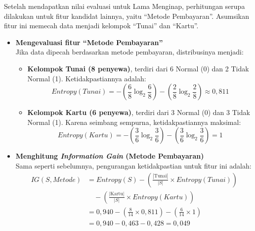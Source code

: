 Setelah mendapatkan nilai evaluasi untuk Lama Menginap, perhitungan serupa dilakukan untuk fitur kandidat lainnya, yaitu ``Metode Pembayaran''. Asumsikan fitur ini memecah data menjadi kelompok ``Tunai'' dan ``Kartu''.

\begin{itemize}
    \item \textbf{Mengevaluasi fitur ``Metode Pembayaran''} \\
    Jika data dipecah berdasarkan metode pembayaran, distribusinya menjadi:
    \begin{itemize}
        \item \textbf{Kelompok Tunai (8 penyewa)}, terdiri dari 6 Normal (0) dan 2 Tidak Normal (1). Ketidakpastiannya adalah:
        $$
        Entropy(Tunai) = - \left(\frac{6}{8} \log_2 \frac{6}{8}\right) - \left(\frac{2}{8} \log_2 \frac{2}{8}\right) \approx 0{,}811
        $$
        
        \item \textbf{Kelompok Kartu (6 penyewa)}, terdiri dari 3 Normal (0) dan 3 Tidak Normal (1). Karena seimbang sempurna, ketidakpastiannya maksimal:
        $$
        Entropy(Kartu) = - \left(\frac{3}{6} \log_2 \frac{3}{6}\right) - \left(\frac{3}{6} \log_2 \frac{3}{6}\right) = 1
        $$
    \end{itemize}
    
    \item \textbf{Menghitung \textit{Information Gain} (Metode Pembayaran)} \\
    Sama seperti sebelumnya, pengurangan ketidakpastian untuk fitur ini adalah:
    \begin{align*}
    IG(S, Metode) &= Entropy(S) - \left( \frac{|\text{Tunai}|}{|S|} \times Entropy(Tunai) \right) \\
    &\quad - \left( \frac{|\text{Kartu}|}{|S|} \times Entropy(Kartu) \right) \\
    &= 0{,}940 - \left( \frac{8}{14} \times 0{,}811 \right) - \left( \frac{6}{14} \times 1 \right) \\
    &= 0{,}940 - 0{,}463 - 0{,}428 = 0{,}049
    \end{align*}
\end{itemize}

